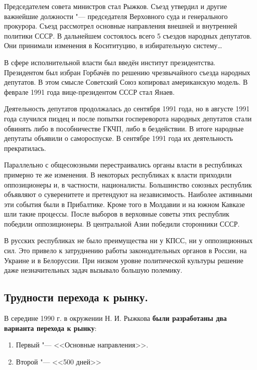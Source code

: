 Председателем совета министров стал Рыжков. Съезд утвердил и другие важнейшие должности "--- председателя Верховного суда и генерального прокурора. Съезд рассмотрел основные направления внешней и внутренней политики СССР. В дальнейшем состоялось всего 5 съездов народных депутатов. Они принимали изменения в Коснтитуцию, в избирательную систему\dots

В сфере исполнительной власти был введён институт президентства. Президентом был избран Горбачёв по решению чрезвычайного съезда народных депутатов. В этом смысле Советский Союз копировал американскую модель. В феврале 1991 года вице-президентом СССР стал Янаев.

Деятельность депутатов продолжалась до сентября 1991 года, но в августе 1991 года случился пиздец и после попытки госпереворота народных депутатов стали обвинять либо в пособничестве ГКЧП, либо в бездействии. В итоге народные депутаты объявили о самороспуске. В сентябре 1991 года их деятельность прекратилась.

Параллельно с общесоюзными перестраивались органы власти в республиках примерно те же изменения. В некоторых республиках к власти приходили оппозиционеры и, в частности, националисты. Большинство союзных республик объявляют о суверенитете и претендуют на независимость. Наиболее активными эти события были в Прибалтике. Кроме того в Молдавии и на южном Кавказе шли такие процессы. После выборов в верховные советы этих республик победили оппозиционеры. В центральной Азии победили сторонники СССР.

В русских республиках не было преимущества ни у КПСС, ни у оппозиционных сил. Это привело к затруднению работы законодательных органов в России, на Украине и в Белоруссии. При низком уровне политической культуры решение даже незначительных задач вызывало большую полемику.

\subsection{Трудности перехода к рынку.}

В середине 1990 г. в окружении Н. И. Рыжкова \textbf{были разработаны два варианта перехода к рынку}:

\begin{enumerate}
    \item Первый "--- <<Основные направления>>.
    \item Второй "--- <<500 дней>>
\end{enumerate}

